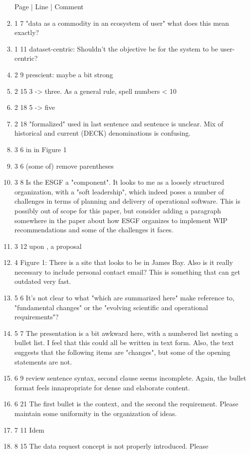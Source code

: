 \documentclass[gmd,manuscript]{copernicus}
\begin{document}
\begin{enumerate}[label=RC2-\arabic*,leftmargin=*]
  Page | Line | Comment
\item 1 7 "data as a commodity in an ecosystem of user" what does this
  mean exactly?
\item 1 11 dataset-centric: Shouldn’t the objective be for the system
  to be user-centric?
\item 2 9 prescient: maybe a bit strong
\item 2 15 3 -> three. As a general rule, spell numbers < 10
\item 2 18 5 -> five
\item 2 18 "formalized" used in last sentence and sentence is unclear.
  Mix of historical and current (DECK) denominations is confusing.
\item 3 6 in in Figure 1
\item 3 6 (some of) remove parentheses
\item 3 8 Is the ESGF a "component". It looks to me as a loosely
  structured organization, with a "soft leadership", which indeed
  poses a number of challenges in terms of planning and delivery of
  operational software. This is possibly out of scope for this paper,
  but consider adding a paragraph somewhere in the paper about how
  ESGF organizes to implement WIP recommendations and some of the
  challenges it faces.
\item 3 12 upon , a proposal
\item 4 Figure 1: There is a site that looks to be in James Bay. Also
  is it really necessary to include personal contact email? This is
  something that can get outdated very fast.
\item 5 6 It’s not clear to what "which are summarized here" make
  reference to, "fundamental changes" or the "evolving scientific and
  operational requirements"?
\item 5 7 The presentation is a bit awkward here, with a numbered list
  nesting a bullet list. I feel that this could all be written in text
  form. Also, the text suggests that the following items are
  "changes", but some of the opening statements are not.
\item 6 9 review sentence syntax, second clause seems incomplete.
  Again, the bullet format feels innapropriate for dense and elaborate
  content.
\item 6 21 The first bullet is the context, and the second the
  requirement. Please maintain some uniformity in the organization of
  ideas.
\item 7 11 Idem
\item 8 15 The data request concept is not properly introduced. Please

\end{enumerate}
\end{document}
